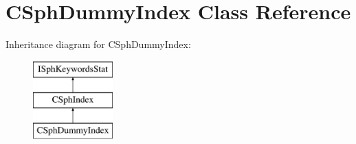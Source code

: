 \hypertarget{classCSphDummyIndex}{\section{C\-Sph\-Dummy\-Index Class Reference}
\label{classCSphDummyIndex}
}
Inheritance diagram for C\-Sph\-Dummy\-Index\-:\begin{figure}[H]
\begin{center}
\leavevmode
\includegraphics[height=3.000000cm]{classCSphDummyIndex}
\end{center}
\end{figure}
